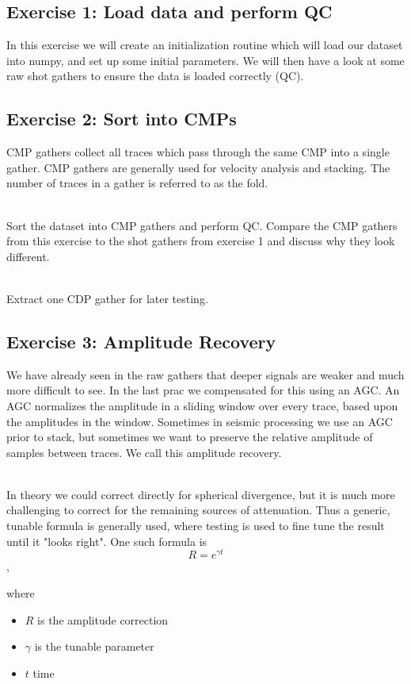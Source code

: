 \subsection*{Exercise 1: Load data and perform QC}
In this exercise we will create an initialization routine which will load our dataset into numpy, and set up some initial parameters. We will then have a look at some raw shot gathers to ensure the data is loaded correctly (QC).
\subsection*{Exercise 2: Sort into CMPs}
CMP gathers collect all traces which pass through the same CMP into a single gather.  CMP gathers are generally used for velocity analysis and stacking. The number of traces in a gather is referred to as the fold.  
\par~\\
Sort the dataset into CMP gathers and perform QC.  Compare the CMP gathers from this exercise to the shot gathers from exercise 1 and discuss why they look different.
\par~\\
Extract one CDP gather for later testing.  

\subsection*{Exercise 3: Amplitude Recovery}
We have already seen in the raw gathers that deeper signals are weaker and much more difficult to see. In the last prac we compensated for this using an AGC.  An AGC normalizes the amplitude in a sliding window over every trace, based upon the amplitudes in the window.  Sometimes in seismic processing we use an AGC prior to stack, but sometimes we want to preserve the relative amplitude of samples between traces.  We call this amplitude recovery.
\par~\\
In theory we could correct directly for spherical divergence, but it is much more challenging to correct for the remaining sources of attenuation.  Thus a generic, tunable formula is generally used, where testing is used to fine tune the result until it "looks right".  One such formula is
\[ R = e^{\gamma t}\],

where
\begin{itemize}
\item $R$ is the amplitude correction
\item $\gamma$ is the tunable parameter
\item $t$ time
\end{itemize}

